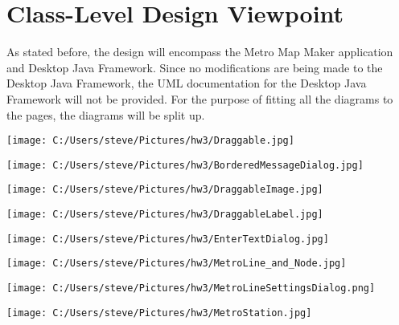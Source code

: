 \documentclass[10pt,a4paper]{article}
\begin{document}
\section{Class-Level Design Viewpoint}
As stated before, the design will encompass the Metro Map Maker application and Desktop Java Framework. Since no modifications are being made to the Desktop Java Framework, the UML documentation for the Desktop Java Framework will not be provided. For the purpose of fitting all the diagrams to the pages, the diagrams will be split up.


\begin{center}
\texttt{[image: C:/Users/steve/Pictures/hw3/Draggable.jpg]}
\end{center}

\begin{center}
\texttt{[image: C:/Users/steve/Pictures/hw3/BorderedMessageDialog.jpg]}
\end{center}

\begin{center}
\texttt{[image: C:/Users/steve/Pictures/hw3/DraggableImage.jpg]}
\end{center}

\begin{center}
\texttt{[image: C:/Users/steve/Pictures/hw3/DraggableLabel.jpg]}
\end{center}

\begin{center}
\texttt{[image: C:/Users/steve/Pictures/hw3/EnterTextDialog.jpg]}
\end{center}

\begin{center}
\texttt{[image: C:/Users/steve/Pictures/hw3/MetroLine\_and\_Node.jpg]}
\end{center}

\begin{center}
\texttt{[image: C:/Users/steve/Pictures/hw3/MetroLineSettingsDialog.png]}
\end{center}

\begin{center}
\texttt{[image: C:/Users/steve/Pictures/hw3/MetroStation.jpg]}
\end{center}
\end{document}
